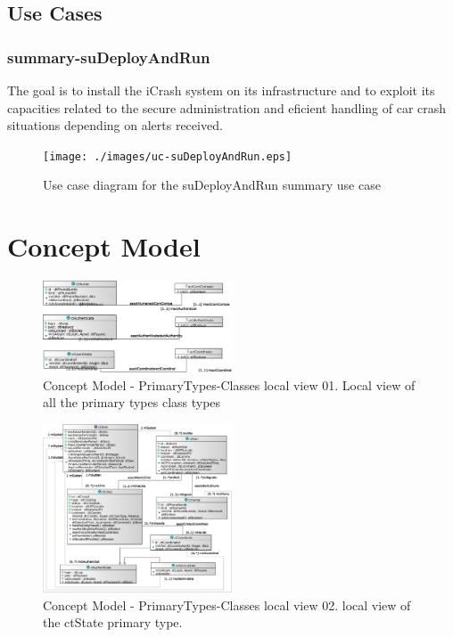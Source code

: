 \subsection{Use Cases}

\subsubsection{summary-suDeployAndRun}

The goal is to install the iCrash system on its infrastructure and to exploit its capacities related to the
secure administration and eficient handling of car crash situations depending on
alerts received.


\begin{figure}[h]
	\centering	
	\captionsetup{justification=centering}
	\texttt{[image: ./images/uc-suDeployAndRun.eps]}
	\caption{Use case diagram for the suDeployAndRun summary use case}
\end{figure}


\section{Concept Model}
 

\begin{figure}[H]
	\centering
	\captionsetup{justification=centering}
	\includegraphics[width=0.5\textwidth]{./images/cm-pt-ct-gv-01.eps}
	\caption{Concept Model - PrimaryTypes-Classes local view 01. Local view of all the primary types
class types }
\end{figure} 

\begin{figure}[H]
	\centering
	\captionsetup{justification=centering}
	\includegraphics[width=0.5\textwidth]{./images/cm-pt-ct-lv-01.eps}
	\caption{Concept Model - PrimaryTypes-Classes local view 02. local view of the ctState primary
type.}
\end{figure} 

